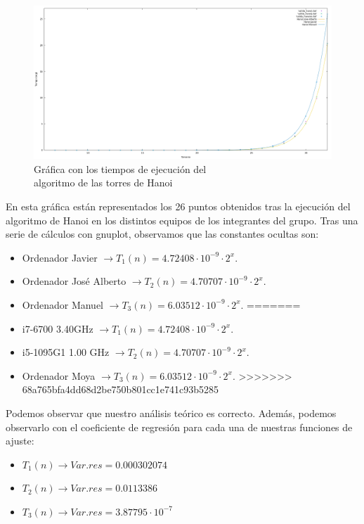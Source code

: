 \documentclass[10pt,a4paper]{article}
\begin{document}
\begin{figure}[h!]
\centering
\includegraphics[scale=0.17]{../../Images/hanoi_combinados.png}
\caption{Gráfica con los tiempos de ejecución del \\algoritmo de las torres de Hanoi}
\end{figure}

\newpage

En esta gráfica están representados los 26 puntos obtenidos tras la ejecución del algoritmo de Hanoi en los distintos equipos de los integrantes del grupo. Tras una serie de cálculos con gnuplot, observamos que las constantes ocultas son:
\begin{itemize}
<<<<<<< HEAD
	\item Ordenador Javier \(\rightarrow T_1(n) = 4.72408 \cdot 10^{-9} \cdot 2^x\).
	\item Ordenador José Alberto \(\rightarrow T_2(n) = 4.70707 \cdot 10^{-9} \cdot 2^x\).
	\item Ordenador Manuel \(\rightarrow T_3(n) = 6.03512 \cdot 10^{-9} \cdot 2^x\).
=======
	\item i7-6700 3.40GHz \(\rightarrow T_1(n) = 4.72408 \cdot 10^{-9} \cdot 2^x\).
	\item i5-1095G1 1.00 GHz \(\rightarrow T_2(n) = 4.70707 \cdot 10^{-9} \cdot 2^x\).
	\item Ordenador Moya \(\rightarrow T_3(n) = 6.03512 \cdot 10^{-9} \cdot 2^x\).
>>>>>>> 68a765bfa4dd68d2be750b801cc1e741c93b5285
\end{itemize}

Podemos observar que nuestro análisis teórico es correcto. Además, podemos observarlo con el coeficiente de regresión para cada una de nuestras funciones de ajuste:
\begin{itemize}
	\item \(T_1(n) \longrightarrow Var.res = 0.000302074\)
	\item \(T_2(n) \longrightarrow Var.res = 0.0113386\)
	\item \(T_3(n) \longrightarrow Var.res = 3.87795 \cdot 10^{-7}\)
\end{itemize}
\end{document}
